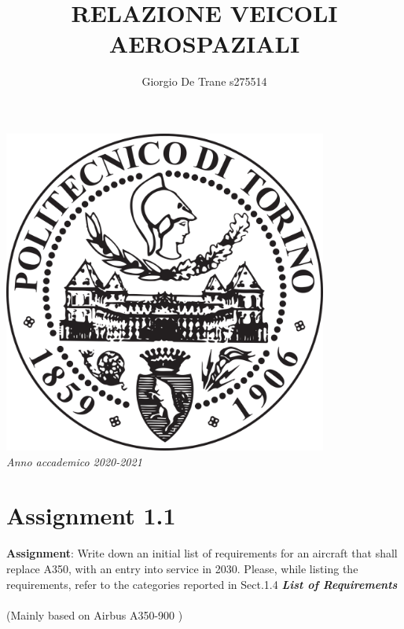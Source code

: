\documentclass{article}
\author{Giorgio De Trane s275514}
\title{\textbf{RELAZIONE VEICOLI AEROSPAZIALI}}
\begin{document}
\maketitle
\begin{center}
    \includegraphics[width=0.8\textwidth]{Sources/Plots_and_Pictures/polito_logo.png}\\
    \textit{Anno accademico 2020-2021}
\end{center}
\pagebreak
\tableofcontents
\pagebreak

\section{Assignment 1.1\label{Assignment_1.1}}

\textbf{Assignment}: Write down an initial list of requirements for an
aircraft that shall replace A350, with an entry into service in 2030.
Please, while listing the requirements, refer to the categories
reported in Sect.1.4
\newline
\newline
\textbf{\textit{List of Requirements}}\\\\ (Mainly based on Airbus A350-900 \autocite{Airbus_A350-900})
\\ 
\end{document}
